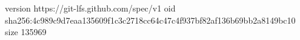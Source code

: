 version https://git-lfs.github.com/spec/v1
oid sha256:4c989c9d7eaa135609f1c3c2718cc64c47c4f937bf82af136b69bb2a8149bc10
size 135969
